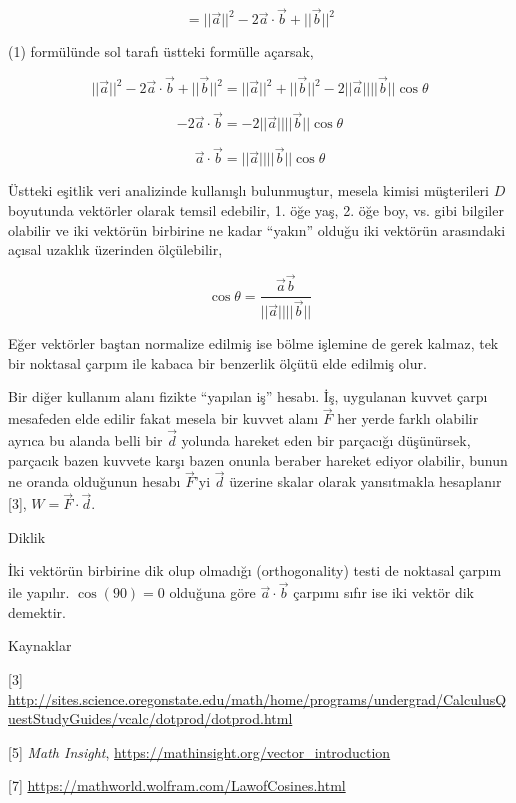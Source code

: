 \documentclass[12pt,fleqn]{article}\usepackage{../../common}
\begin{document}
$$
= ||\vec{a}||^2 - 2\vec{a}\cdot\vec{b} + ||\vec{b}||^2
$$

(1) formülünde sol tarafı üstteki formülle açarsak,

$$
||\vec{a}||^2 - 2\vec{a}\cdot\vec{b} + ||\vec{b}||^2 =
||\vec{a}||^2 + ||\vec{b}||^2 - 2 ||\vec{a}|| ||\vec{b}|| \cos\theta
$$

$$
- 2\vec{a}\cdot\vec{b} = - 2 ||\vec{a}|| ||\vec{b}|| \cos\theta
$$

$$
\vec{a}\cdot\vec{b} = ||\vec{a}|| ||\vec{b}|| \cos\theta
$$

Üstteki eşitlik veri analizinde kullanışlı bulunmuştur, mesela kimisi
müşterileri $D$ boyutunda vektörler olarak temsil edebilir, 1. öğe yaş, 2. öğe
boy, vs. gibi bilgiler olabilir ve iki vektörün birbirine ne kadar ``yakın''
olduğu iki vektörün arasındaki açısal uzaklık üzerinden ölçülebilir,

$$
\cos\theta = \frac{\vec{a}\vec{b}}{||\vec{a}|| ||\vec{b}||}
$$

Eğer vektörler baştan normalize edilmiş ise bölme işlemine de gerek kalmaz, tek
bir noktasal çarpım ile kabaca bir benzerlik ölçütü elde edilmiş olur.

Bir diğer kullanım alanı fizikte ``yapılan iş'' hesabı. İş, uygulanan kuvvet
çarpı mesafeden elde edilir fakat mesela bir kuvvet alanı $\vec{F}$ her yerde
farklı olabilir ayrıca bu alanda belli bir $\vec{d}$ yolunda hareket eden bir
parçacığı düşünürsek, parçacık bazen kuvvete karşı bazen onunla beraber hareket
ediyor olabilir, bunun ne oranda olduğunun hesabı $\vec{F}$'yi $\vec{d}$ üzerine
skalar olarak yansıtmakla hesaplanır [3], $W = \vec{F} \cdot \vec{d}$.

Diklik

İki vektörün birbirine dik olup olmadığı (orthogonality) testi de noktasal
çarpım ile yapılır. $\cos(90) = 0$ olduğuna göre $\vec{a}\cdot\vec{b}$ çarpımı
sıfır ise iki vektör dik demektir. 

Kaynaklar

[3] \url{http://sites.science.oregonstate.edu/math/home/programs/undergrad/CalculusQuestStudyGuides/vcalc/dotprod/dotprod.html}

[5] {\em Math Insight},
    \url{https://mathinsight.org/vector_introduction}

[7] \url{https://mathworld.wolfram.com/LawofCosines.html}
\end{document}
